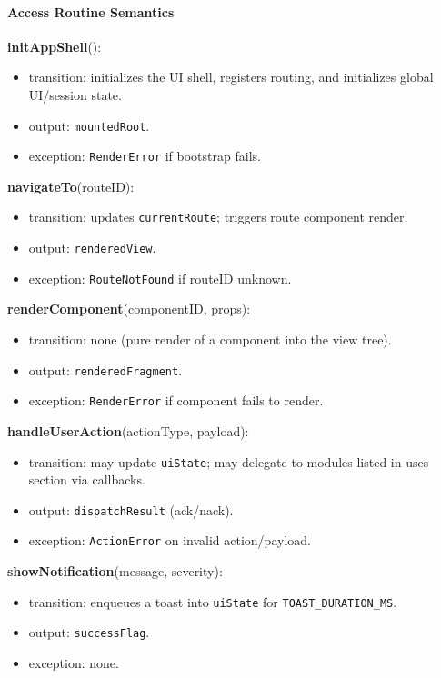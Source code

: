\documentclass[12pt, titlepage]{article}
\begin{document}
  \paragraph{Access Routine Semantics}

  \noindent \textbf{initAppShell}():
  \begin{itemize}
    \item transition: initializes the UI shell, registers routing, and initializes global UI/session state.
    \item output: \texttt{mountedRoot}.
    \item exception: \texttt{RenderError} if bootstrap fails.
  \end{itemize}

  \noindent \textbf{navigateTo}(routeID):
  \begin{itemize}
    \item transition: updates \texttt{currentRoute}; triggers route component render.
    \item output: \texttt{renderedView}.
    \item exception: \texttt{RouteNotFound} if routeID unknown.
  \end{itemize}

  \noindent \textbf{renderComponent}(componentID, props):
  \begin{itemize}
    \item transition: none (pure render of a component into the view tree).
    \item output: \texttt{renderedFragment}.
    \item exception: \texttt{RenderError} if component fails to render.
  \end{itemize}

  \noindent \textbf{handleUserAction}(actionType, payload):
  \begin{itemize}
    \item transition: may update \texttt{uiState}; may delegate to modules listed in uses section via callbacks.
    \item output: \texttt{dispatchResult} (ack/nack).
    \item exception: \texttt{ActionError} on invalid action/payload.
  \end{itemize}

  \noindent \textbf{showNotification}(message, severity):
  \begin{itemize}
    \item transition: enqueues a toast into \texttt{uiState} for \texttt{TOAST\_DURATION\_MS}.
    \item output: \texttt{successFlag}.
    \item exception: none.
  \end{itemize}
\end{document}
